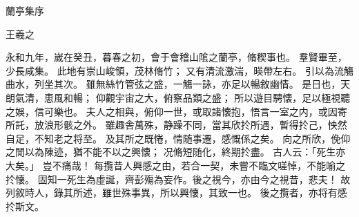 蘭亭集序

王羲之

永和九年，嵗在癸丑，暮春之初，會于會稽山隂之蘭亭，脩稧事也。
羣賢畢至，少長咸集。
此地有崇山峻領，茂林脩竹；
又有清流激湍，暎帶左右。
引以為流觴曲水，列坐其次。
雖無絲竹管弦之盛，一觴一詠，亦足以暢敘幽情。
是日也，天朗氣清，恵風和暢；
仰觀宇宙之大，俯察品類之盛；
所以遊目騁懐，足以極視聽之娛，信可樂也。
夫人之相與，俯仰一世，或取諸懐抱，悟言一室之内，或因寄所託，放浪形骸之外。
雖趣舎萬殊，静躁不同，當其欣扵所遇，暫得扵己，怏然自足，不知老之将至。
及其所之既惓，情随事遷，感慨係之矣。
向之所欣，俛仰之閒以為陳迹，猶不能不以之興懐；
况脩短随化，終期扵盡。
古人云：「死生亦大矣。」
豈不痛哉！
每攬昔人興感之由，若合一契，未嘗不臨文嗟悼，不能喻之扵懐。
固知一死生為虛誕，齊彭殤為妄作。後之視今，亦由今之視昔，悲夫！
故列敘時人，錄其所述，雖世殊事異，所以興懐，其致一也。
後之攬者，亦将有感扵斯文。